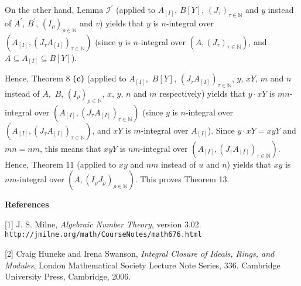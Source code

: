 \documentclass[12pt,final,notitlepage,onecolumn]{article}%
\begin{document}
On the other hand, Lemma $\mathcal{I}^{\prime}$ (applied to $A_{\left[
I\right]  }$, $B\left[  Y\right]  $, $\left(  J_{\tau}\right)  _{\tau
\in\mathbb{N}}$ and $y$ instead of $A^{\prime}$, $B^{\prime}$, $\left(
I_{\rho}\right)  _{\rho\in\mathbb{N}}$ and $v$) yields that $y$ is
$n$-integral over $\left(  A_{\left[  I\right]  },\left(  J_{\tau}A_{\left[
I\right]  }\right)  _{\tau\in\mathbb{N}}\right)  $ (since $y$ is $n$-integral
over $\left(  A,\left(  J_{\tau}\right)  _{\tau\in\mathbb{N}}\right)  $, and
$A\subseteq A_{\left[  I\right]  }\subseteq B\left[  Y\right]  $).

Hence, Theorem 8 \textbf{(c)} (applied to $A_{\left[  I\right]  },$ $B\left[
Y\right]  $, $\left(  J_{\tau}A_{\left[  I\right]  }\right)  _{\tau
\in\mathbb{N}}$, $y$, $xY$, $m$ and $n$ instead of $A,$ $B$, $\left(  I_{\rho
}\right)  _{\rho\in\mathbb{N}}$, $x$, $y$, $n$ and $m$ respectively) yields
that $y\cdot xY$ is $mn$-integral over $\left(  A_{\left[  I\right]  },\left(
J_{\tau}A_{\left[  I\right]  }\right)  _{\tau\in\mathbb{N}}\right)  $ (since
$y$ is $n$-integral over $\left(  A_{\left[  I\right]  },\left(  J_{\tau
}A_{\left[  I\right]  }\right)  _{\tau\in\mathbb{N}}\right)  $, and $xY$ is
$m$-integral over $A_{\left[  I\right]  }$). Since $y\cdot xY=xyY$ and
$mn=nm$, this means that $xyY$ is $nm$-integral over $\left(  A_{\left[
I\right]  },\left(  J_{\tau}A_{\left[  I\right]  }\right)  _{\tau\in
\mathbb{N}}\right)  $. Hence, Theorem 11 (applied to $xy$ and $nm$ instead of
$u$ and $n$) yields that $xy$ is $nm$-integral over $\left(  A,\left(
I_{\rho}J_{\rho}\right)  _{\rho\in\mathbb{N}}\right)  $. This proves Theorem 13.

\begin{center}
\color{blue} \textbf{References} \color{black}
\end{center}

[1] J. S. Milne, \textit{Algebraic Number Theory}, version 3.02.\newline%
\texttt{http://jmilne.org/math/CourseNotes/math676.html}

[2] Craig Huneke and Irena Swanson, \textit{Integral Closure of Ideals, Rings,
and Modules}, London Mathematical Society Lecture Note Series, 336. Cambridge
University Press, Cambridge, 2006.
\end{document}
